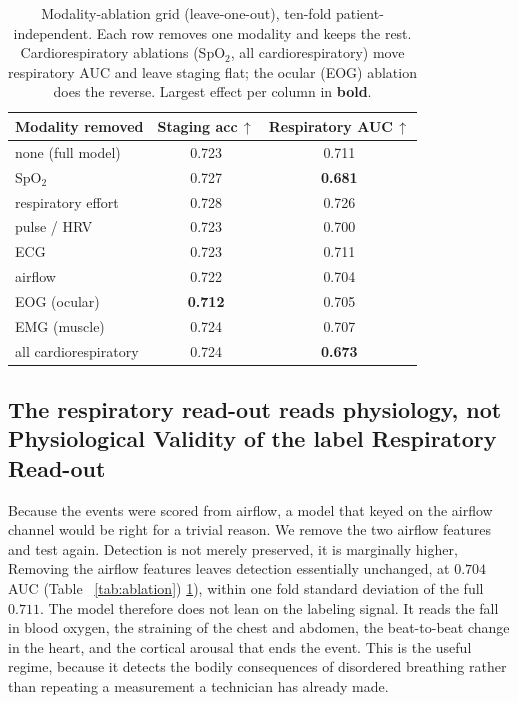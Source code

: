 \documentclass[journal]{IEEEtran}
\newcommand{\mmAuc}{0.711}
\newcommand{\noflowAuc}{0.704}
\providecommand{\DIFaddtex}[1]{{\protect\color{blue} \sf #1}} %
\providecommand{\DIFdeltex}[1]{{\protect\color{red} \scriptsize #1}} %
\providecommand{\DIFaddbegin}{} %
\providecommand{\DIFaddend}{} %
\providecommand{\DIFdelbegin}{} %
\providecommand{\DIFdelend}{} %
\providecommand{\DIFadd}[1]{\texorpdfstring{\DIFaddtex{#1}}{#1}} %
\providecommand{\DIFdel}[1]{\texorpdfstring{\DIFdeltex{#1}}{}} %
\providecommand{\DIFscaledelfig}{0.5}
\newlength{\DIFdelgraphicswidth} %
\newlength{\DIFdelgraphicsheight} %
\providecommand{\DIFaddincludegraphics}[2][]{{\color{blue}\fbox{\DIFOincludegraphics[#1]{#2}}}} %
\providecommand{\DIFdelincludegraphics}[2][]{%
\sbox{\DIFdelgraphicsbox}{\DIFOincludegraphics[#1]{#2}}%
\settoboxwidth{\DIFdelgraphicswidth}{\DIFdelgraphicsbox} %
\settoboxtotalheight{\DIFdelgraphicsheight}{\DIFdelgraphicsbox} %
\scalebox{\DIFscaledelfig}{%
\parbox[b]{\DIFdelgraphicswidth}{\usebox{\DIFdelgraphicsbox}\\[-\baselineskip] \rule{\DIFdelgraphicswidth}{0em}}\llap{\resizebox{\DIFdelgraphicswidth}{\DIFdelgraphicsheight}{%
\setlength{\unitlength}{\DIFdelgraphicswidth}%
\begin{picture}(1,1)%
\thicklines\linethickness{2pt} %
{\color[rgb]{1,0,0}\put(0,0){\framebox(1,1){}}}%
{\color[rgb]{1,0,0}\put(0,0){\line( 1,1){1}}}%
{\color[rgb]{1,0,0}\put(0,1){\line(1,-1){1}}}%
\end{picture}%
}\hspace*{3pt}}} %
} %
\DeclareRobustCommand{\DIFaddbegin}{\DIFOaddbegin \let\includegraphics\DIFaddincludegraphics} %
\DeclareRobustCommand{\DIFaddend}{\DIFOaddend \let\includegraphics\DIFOincludegraphics} %
\DeclareRobustCommand{\DIFdelbegin}{\DIFOdelbegin \let\includegraphics\DIFdelincludegraphics} %
\DeclareRobustCommand{\DIFdelend}{\DIFOaddend \let\includegraphics\DIFOincludegraphics} %
\begin{document}
\DIFaddbegin \begin{table}[t]
\caption{Modality-ablation grid (leave-one-out), ten-fold patient-independent. Each row removes
one modality and keeps the rest. Cardiorespiratory ablations (SpO$_2$, all cardiorespiratory)
move respiratory AUC and leave staging flat; the ocular (EOG) ablation does the reverse. Largest
effect per column in \textbf{bold}.}
\label{tab:ablate}
\centering
\setlength{\tabcolsep}{8pt}
\begin{tabular}{lcc}
\toprule
Modality removed & Staging acc\,$\uparrow$ & Respiratory AUC\,$\uparrow$ \\
\midrule
none (full model)        & 0.723 & 0.711 \\
SpO$_2$                  & 0.727 & \textbf{0.681} \\
respiratory effort       & 0.728 & 0.726 \\
pulse / HRV              & 0.723 & 0.700 \\
ECG                      & 0.723 & 0.711 \\
airflow                  & 0.722 & 0.704 \\
EOG (ocular)             & \textbf{0.712} & 0.705 \\
EMG (muscle)             & 0.724 & 0.707 \\
all cardiorespiratory    & 0.724 & \textbf{0.673} \\
\bottomrule
\end{tabular}
\end{table}

\DIFaddend \subsection{\DIFdelbegin \DIFdel{The respiratory read-out reads physiology, not }\DIFdelend \DIFaddbegin \DIFadd{Physiological Validity of }\DIFaddend the \DIFdelbegin \DIFdel{label}\DIFdelend \DIFaddbegin \DIFadd{Respiratory Read-out}\DIFaddend }
\label{sec:noflow}
Because the events were scored from airflow, a model that keyed on the airflow channel would
be right for a trivial reason. \DIFdelbegin \DIFdel{We remove the two airflow features and test again. Detection is
not merely preserved, it is marginally higher, }\DIFdelend \DIFaddbegin \DIFadd{Removing the airflow features leaves detection essentially
unchanged, }\DIFaddend at $\noflowAuc$ AUC (Table~\DIFdelbegin \DIFdel{\ref{tab:ablation})}\DIFdelend \DIFaddbegin \DIFadd{\ref{tab:ablate}), within one fold standard deviation of
the full $\mmAuc$}\DIFaddend . The model therefore does not lean on the labeling signal. It reads the fall
in blood oxygen, the straining of the chest and abdomen, the beat-to-beat change in the heart,
and the cortical arousal that ends the event. This is the useful regime, because it detects the
bodily consequences of disordered breathing rather than repeating a measurement a technician
has already made.
\end{document}
